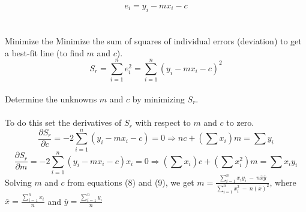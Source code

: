 \documentclass[prl,twocolumn,showpacs,preprintnumbers,superscriptaddress]{revtex4}
\theoremstyle{plain}
\theoremstyle{definition}
\begin{document}
\begin{widetext}
\begin{equation}
    e_{i} = y_{i} - mx_{i} - c
\end{equation}
\\
\\
Minimize the Minimize the sum of squares of individual errors  (deviation) to get a best-fit line (to find $m$ and $c$).
\begin{equation}
    S_{r} = \sum_{i=1}^n e_{i}^2 = \sum_{i=1}^n (y_{i} - mx_{i} - c)^2
\end{equation}
\\
Determine the unknowns $m$ and $c$ by minimizing $S_{r}$.
\\
\\
To do this set the derivatives of $S_{r}$ with respect to $m$ and $c$ to zero.
\begin{equation}
    \frac{\partial S_{r}}{\partial c} = -2\sum_{i=1}^n (y_{i} - mx_{i} - c) = 0 \Rightarrow nc + (\sum x_{i})m = \sum y_{i}
\end{equation}
\begin{equation}
    \frac{\partial S_{r}}{\partial m} = -2\sum_{i=1}^n (y_{i} - mx_{i} - c)x_{i} = 0 \Rightarrow (\sum x_{i})c + (\sum x_{i}^2)m = \sum x_{i} y_{i}
\end{equation}
Solving $m$ and $c$ from equations (8) and (9), we get
$m = \frac{\sum_{i=1}^n x_{i}y_{i} \  - \  n\bar x\bar y}{\sum_{i=1}^n x_{i}^2 \  - \  n(\bar x)^2}$, where $\bar x = \frac{\sum_{i=1}^nx_{i}}{n}$ and $\bar y = \frac{\sum_{i=1}^ny_{i}}{n}$
\\
\\
\\
\end{widetext}
\end{document}
